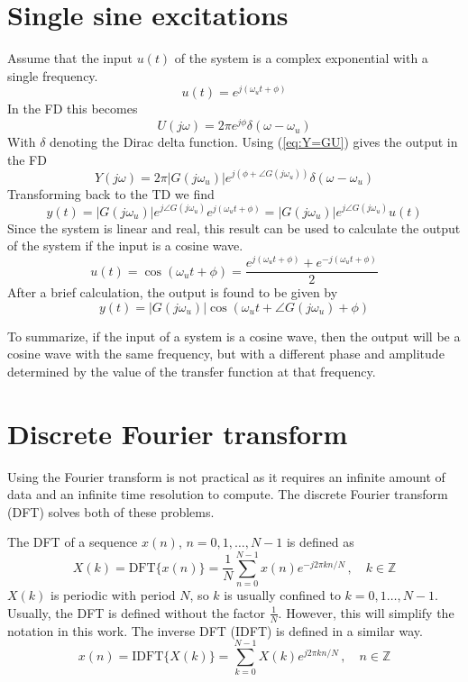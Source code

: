 \newpage
\section{Single sine excitations}
Assume that the input $u(t)$ of the system is a complex exponential with a single frequency.
\begin{equation*}
    u(t) = e^{j (\omega_u t + \phi)}
\end{equation*}
In the FD this becomes
\begin{equation*}
    U(j\omega) = 2\pi e^{j\phi} \delta(\omega-\omega_u)
\end{equation*}
With $\delta$ denoting the Dirac delta function. Using (\ref{eq:Y=GU}) gives the output in the FD
\begin{equation*}
    Y(j\omega) = 2\pi |G(j\omega_u)| e^{j(\phi+\angle{G(j\omega_u)})} \delta(\omega-\omega_u)
\end{equation*}
Transforming back to the TD we find
\begin{equation*}
    y(t) = |G(j\omega_u)| e^{j \angle{G(j\omega_u)}} e^{j (\omega_u t + \phi)} = |G(j\omega_u)| e^{j \angle{G(j\omega_u)}} u(t)
\end{equation*}
Since the system is linear and real, this result can be used to calculate the output of the system if the input is a cosine wave.
\begin{equation*}
    u(t) = \cos{(\omega_u t + \phi)} = \frac{e^{j(\omega_u t + \phi)}+e^{-j(\omega_u t + \phi)}}{2}
\end{equation*}
After a brief calculation, the output is found to be given by
\begin{equation*}
\boxed{
    y(t) = |G(j\omega_u)| \cos{(\omega_u t + \angle{G(j\omega_u)} + \phi)}
    }
\end{equation*}

To summarize, if the input of a system is a cosine wave, then the output will be a cosine wave with the same frequency, but with a different phase and amplitude determined by the value of the transfer function at that frequency.

\section{Discrete Fourier transform}
Using the Fourier transform is not practical as it requires an infinite amount of data and an infinite time resolution to compute. The discrete Fourier transform (DFT) solves both of these problems.

The DFT of a sequence $x(n)$, $n = 0,1,\ldots,N-1$ is defined as
\begin{equation*}
    X(k) = \text{DFT}\{x(n)\} = \frac{1}{N}\sum_{n=0}^{N-1} x(n) e^{-j 2\pi k n/N} \,,\quad k \in \mathds{Z}
\end{equation*}
$X(k)$ is periodic with period $N$, so $k$ is usually confined to $k = 0,1 \ldots, N-1$. Usually, the DFT is defined without the factor $\frac{1}{N}$. However, this will simplify the notation in this work. The inverse DFT (IDFT) is defined in a similar way.
\begin{equation*}
    x(n) = \text{IDFT}\{X(k)\} = \sum_{k=0}^{N-1} X(k) e^{j 2\pi k n/N} \,,\quad n \in \mathds{Z}
\end{equation*}

